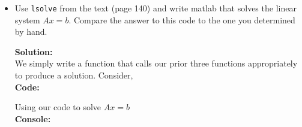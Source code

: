 \documentclass[12pt]{article}
\makeatletter
\theoremstyle{homework}
\newenvironment{exercise}[1]
{\def\@currentlabel{#1}\exercisecore}
{\endexercisecore}
\newcommand{\localhead}[1]{\par\smallskip\noindent\textbf{#1}\nobreak\\}%
\newcommand\solution{\localhead{Solution:}}
\makeatother
\begin{document}
\begin{exercise} {Problem 7.3 [Modified]}
\begin{itemize}
	Note that the code on page 140 is being sneaky.  Rather than building two matrices, it builds just one. Since $L$ always has 1s on the diagonal, it only has interesting entries below the diagonal.  And since $U$ is all zeros below the diagonal, there's space there to store the entries of $L$!  This is an important space saving technique when the matrices involved are large: no need to go around working with extra matrices that are half zeros and use up twice the needed storage.  But for the purposes of this exercise and clarity,
	we'll return $L$ and $U$ separately.\\

	\textbf{Code:}
	\begin{center}
		
	\end{center}
	Testing our code with the 3x3 matrix presented in class.\\

	\textbf{Console:}
	\begin{center}
		
	\end{center}
\vspace{.25in}

	\item Use {\tt lsolve} from the text (page 140) and write matlab that solves the linear system 
	$Ax = b$. Compare the answer to this code to the one you determined by hand.

	\solution We simply write a function that calls our prior three functions appropriately to produce a solution. Consider,\\

	\textbf{Code:}
	\begin{center}
		
	\end{center}

	Using our code to solve $Ax = b$\\

	\textbf{Console:}
	\begin{center}
		
	\end{center}

\end{itemize}
\end{exercise}

\vspace{1in}
\end{document}
